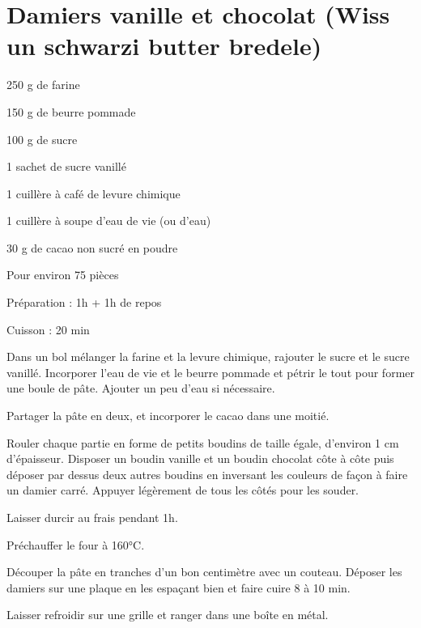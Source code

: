 \section{Damiers vanille et chocolat (Wiss un schwarzi butter bredele)}

\begin{ingredients}
\item 250 g de farine
\item 150 g de beurre pommade
\item 100 g de sucre
\item 1 sachet de sucre vanillé
\item 1 cuillère à café de levure chimique
\item 1 cuillère à soupe d'eau de vie (ou d'eau)
\item 30 g de cacao non sucré en poudre
\end{ingredients}
\begin{infos}
\item Pour environ 75 pièces		%
\item Préparation : 1h + 1h de repos		%
\item Cuisson : 20 min		%
\end{infos}
\begin{etapes}
\item Dans un bol mélanger la farine et la levure chimique, rajouter le sucre et le sucre vanillé. Incorporer l’eau de vie et le beurre pommade et pétrir le tout pour former une boule de pâte. Ajouter un peu d'eau si nécessaire.
\item Partager la pâte en deux, et incorporer le cacao dans une moitié.
\item Rouler chaque partie en forme de petits boudins de taille égale, d'environ 1 cm d'épaisseur. Disposer un boudin vanille et un boudin chocolat côte à côte puis déposer par dessus deux autres boudins en inversant les couleurs de façon à faire un damier carré. Appuyer légèrement de tous les côtés pour les souder.
\item Laisser durcir au frais pendant 1h.
\item Préchauffer le four à 160°C.
\item Découper la pâte en tranches d'un bon centimètre avec un couteau. Déposer les damiers sur une plaque en les espaçant bien et faire cuire 8 à 10 min.
\item Laisser refroidir sur une grille et ranger dans une boîte en métal.
\end{etapes}
